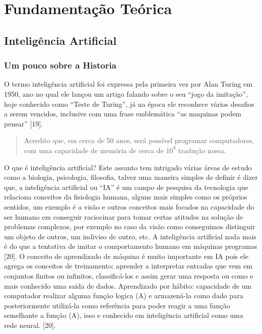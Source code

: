 \chapter{Fundamentação Teórica}\label{cap:fundTeo}

\section{Inteligência Artificial}

\subsection{Um pouco sobre a Historia}
O termo inteligência artificial foi expressa pela primeira vez por Alan Turing em 1950, ano no qual ele lançou um artigo falando sobre o seu “jogo da imitação”, hoje conhecido como “Teste de Turing”, já na época ele reconhece vários desafios a serem vencidos, inclusive com uma frase emblemática “as maquinas podem pensar” [19].
 \begin{quotation}
    \footnotesize Acredito que, em cerca de 50 anos, será possível programar computadores, com uma capacidade de memória de cerca de \(10^9\) \cite{alanT} tradução nossa.
 \end{quotation}
O que é inteligência artificial? Este assunto tem intrigado várias áreas de estudo como a biologia, psicologia, filosofia, talvez uma maneira simples de definir é dizer que, a  inteligência artificial ou “IA” é um campo de pesquisa da tecnologia que relaciona conceitos da fisiologia humana, alguns mais simples como os próprios sentidos,  um exemplo é a visão e outros conceitos mais focados na capacidade do ser humano em conseguir raciocinar para tomar certas atitudes na solução de problemas complexos, por exemplo no caso da visão como conseguimos distinguir um objeto de outros, um indiviso de outro, etc. A inteligência artificial nada mais é do que a tentativa de imitar o comportamento humano em máquinas programas [20].
O conceito de aprendizado de máquina é muito importante em IA pois ele agrega os conceitos de treinamento: aprender a interpretar entradas que vem em conjuntos finitos ou infinitos, classificá-los e assim gerar uma resposta ou como e mais conhecido uma saída de dados. Aprendizado por hábito: capacidade de um computador realizar alguma função logica (A) e armazená-la como dado para posteriormente utilizá-la como referência para poder reagir a uma função semelhante a função (A), isso e conhecido em inteligência artificial como uma rede neural.  [20].


